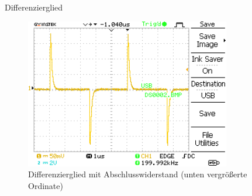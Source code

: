 \documentclass[ngerman]{scrartcl}
\theoremstyle{definition}
\begin{document}
\begin{aufgabe}{Differenzierglied}
\begin{figure}[H]
				\includegraphics[width=0.8\textwidth]{MesswerteVersuch1/DS0002.png}
				\caption{Differenzierglied mit Abschlusswiderstand (unten vergrößerte Ordinate)}
				\label{fig:DS0001,2}
			\end{figure}
			\clearpage
			\auswertung

		\end{aufgabe}

\end{document}
